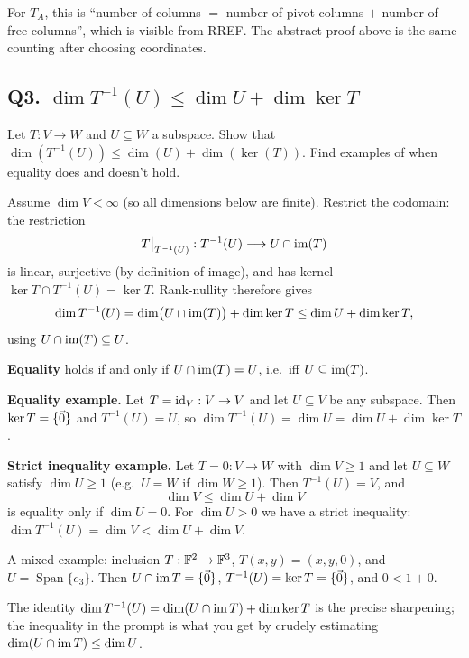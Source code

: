 \begin{laterbox}
For $T_A$, this is ``number of columns $=$ number of pivot columns $+$ number of
free columns'', which is visible from RREF. The abstract proof above is the
same counting after choosing coordinates.
\end{laterbox}

\subsection{Q3. $\dim T^{-1}(U)\le\dim U+\dim\ker T$}

\begin{promptbox}
Let $T:V\to W$ and $U\subseteq W$ a subspace. Show that
$\dim(T^{-1}(U))\le\dim(U)+\dim(\ker(T))$.
Find examples of when equality does and doesn't hold.
\end{promptbox}

\begin{coursebox}
Assume $\dim V<\infty$ (so all dimensions below are finite). Restrict the
codomain: the restriction
\[
T\big|_{T^{-1}(U)}:T^{-1}(U)\longrightarrow U\cap\operatorname{im}(T)
\]
is linear, surjective (by definition of image), and has kernel
$\ker T\cap T^{-1}(U)=\ker T$. Rank-nullity therefore gives
\[
\dim T^{-1}(U)
=\dim\bigl(U\cap\operatorname{im}(T)\bigr)+\dim\ker T
\le\dim U+\dim\ker T,
\]
using $U\cap\operatorname{im}(T)\subseteq U$.

\textbf{Equality} holds if and only if $U\cap\operatorname{im}(T)=U$, i.e.\ iff
$U\subseteq\operatorname{im}(T)$.

\textbf{Equality example.}
Let $T=\operatorname{id}_V:V\to V$ and let $U\subseteq V$ be any subspace. Then
$\ker T=\{\vec{0}\}$ and $T^{-1}(U)=U$, so
$\dim T^{-1}(U)=\dim U=\dim U+\dim\ker T$.

\textbf{Strict inequality example.}
Let $T=0:V\to W$ with $\dim V\ge 1$ and let $U\subseteq W$ satisfy
$\dim U\ge 1$ (e.g.\ $U=W$ if $\dim W\ge 1$). Then $T^{-1}(U)=V$, and
\[
\dim V\le\dim U+\dim V
\]
is equality only if $\dim U=0$. For $\dim U>0$ we have a strict inequality:
$\dim T^{-1}(U)=\dim V<\dim U+\dim V$.

A mixed example: inclusion $T:\mathbb{F}^2\to\mathbb{F}^3$, $T(x,y)=(x,y,0)$, and
$U=\operatorname{Span}\{e_3\}$. Then $U\cap\operatorname{im} T=\{\vec{0}\}$,
$T^{-1}(U)=\ker T=\{\vec{0}\}$, and $0<1+0$.
\end{coursebox}

\begin{laterbox}
The identity $\dim T^{-1}(U)=\dim(U\cap\operatorname{im} T)+\dim\ker T$ is the precise
sharpening; the inequality in the prompt is what you get by crudely estimating
$\dim(U\cap\operatorname{im} T)\le\dim U$.
\end{laterbox}

